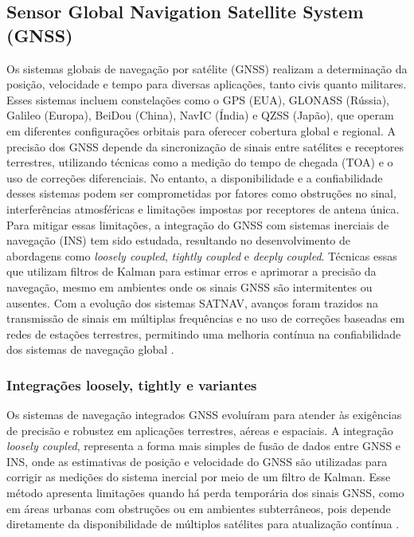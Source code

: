\subsection{Sensor Global Navigation Satellite System (GNSS)}

Os sistemas globais de navegação por satélite (GNSS) realizam a determinação da posição, velocidade e tempo para diversas aplicações, tanto civis quanto militares. Esses sistemas incluem constelações como o GPS (EUA), GLONASS (Rússia), Galileo (Europa), BeiDou (China), NavIC (Índia) e QZSS (Japão), que operam em diferentes configurações orbitais para oferecer cobertura global e regional. A precisão dos GNSS depende da sincronização de sinais entre satélites e receptores terrestres, utilizando técnicas como a medição do tempo de chegada (TOA) e o uso de correções diferenciais. No entanto, a disponibilidade e a confiabilidade desses sistemas podem ser comprometidas por fatores como obstruções no sinal, interferências atmosféricas e limitações impostas por receptores de antena única. Para mitigar essas limitações, a integração do GNSS com sistemas inerciais de navegação (INS) tem sido estudada, resultando no desenvolvimento de abordagens como \textit{loosely coupled}, \textit{tightly coupled} e \textit{deeply coupled}. Técnicas essas que utilizam filtros de Kalman para estimar erros e aprimorar a precisão da navegação, mesmo em ambientes onde os sinais GNSS são intermitentes ou ausentes. Com a evolução dos sistemas SATNAV, avanços foram trazidos na transmissão de sinais em múltiplas frequências e no uso de correções baseadas em redes de estações terrestres, permitindo uma melhoria contínua na confiabilidade dos sistemas de navegação global \cite{kaplan2017}.

\subsubsection{Integrações loosely, tightly e variantes}

Os sistemas de navegação integrados GNSS evoluíram para atender às exigências de precisão e robustez em aplicações terrestres, aéreas e espaciais. A integração \textit{loosely coupled}, representa a forma mais simples de fusão de dados entre GNSS e INS, onde as estimativas de posição e velocidade do GNSS são utilizadas para corrigir as medições do sistema inercial por meio de um filtro de Kalman. Esse método apresenta limitações quando há perda temporária dos sinais GNSS, como em áreas urbanas com obstruções ou em ambientes subterrâneos, pois depende diretamente da disponibilidade de múltiplos satélites para atualização contínua \cite{falco2017}.

